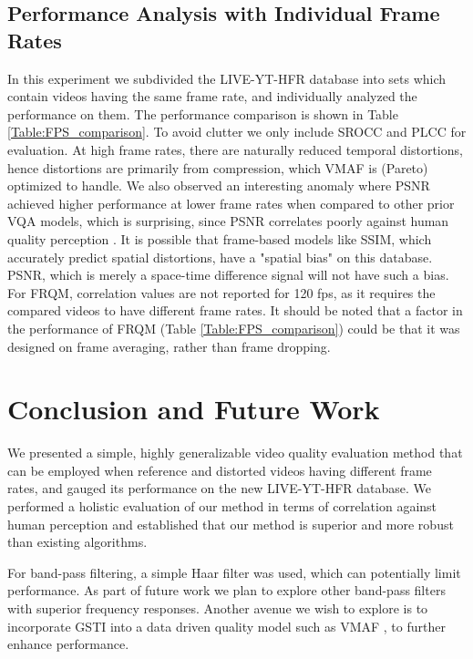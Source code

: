 \documentclass[journal]{IEEEtran}
\begin{document}
\vspace{-7pt}
\subsection{Performance Analysis with Individual Frame Rates}
In this experiment we subdivided the LIVE-YT-HFR database into sets which contain videos having the same frame rate, and individually analyzed the performance on them. The performance comparison is shown in Table \ref{Table:FPS_comparison}. To avoid clutter we only include SROCC and PLCC for evaluation. At high frame rates, there are naturally reduced temporal distortions, hence distortions are primarily from compression, which VMAF is (Pareto) optimized to handle. We also observed an interesting anomaly where PSNR achieved higher performance at lower frame rates when compared to other prior VQA models, which is surprising, since PSNR correlates poorly against human quality perception \cite{wang2009mean}. It is possible that frame-based models like SSIM, which accurately predict spatial distortions, have a "spatial bias" on this database. PSNR, which is merely a space-time difference signal will not have such a bias. For FRQM, correlation values are not reported for 120 fps, as it requires the compared videos to have different frame rates. It should be noted that a factor in the performance of FRQM (Table \ref{Table:FPS_comparison}) could be that it was designed on frame averaging, rather than frame dropping.





\section{Conclusion and Future Work}
\label{sec:conclusion}
We presented a simple, highly generalizable video quality evaluation method that can be employed when reference and distorted videos having different frame rates, and gauged its performance on the new LIVE-YT-HFR database. We performed a holistic evaluation of our method in terms of correlation against human perception and established that our method is superior and more robust than existing algorithms.

For band-pass filtering, a simple Haar filter was used, which can potentially limit performance. As part of future work we plan to explore other band-pass filters with superior frequency responses. Another avenue we wish to explore is to incorporate GSTI into a data driven quality model such as VMAF \cite{VMAF2016}, to further enhance performance.

\ifCLASSOPTIONcaptionsoff
  \newpage
\fi




\end{document}
